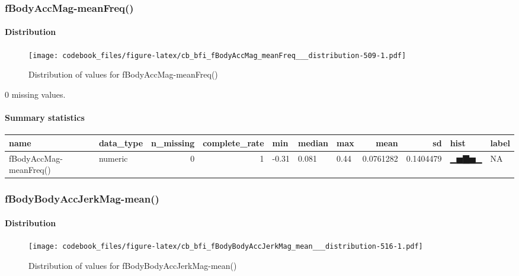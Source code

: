 \documentclass[
]{article}
\begin{document}
\hypertarget{fBodyAccMag_meanFreq__}{%
\subsubsection{fBodyAccMag-meanFreq()}\label{fBodyAccMag_meanFreq__}}

\hypertarget{fBodyAccMag_meanFreq___distribution}{%
\paragraph{Distribution}\label{fBodyAccMag_meanFreq___distribution}}

\begin{figure}
\centering
\texttt{[image: codebook\_files/figure-latex/cb\_bfi\_fBodyAccMag\_meanFreq\_\_\_distribution-509-1.pdf]}
\caption{Distribution of values for fBodyAccMag-meanFreq()}
\end{figure}

0 missing values.

\hypertarget{fBodyAccMag_meanFreq___summary}{%
\paragraph{Summary statistics}\label{fBodyAccMag_meanFreq___summary}}

\begin{longtable}[]{@{}llrrlllrrll@{}}
\toprule
name & data\_type & n\_missing & complete\_rate & min & median & max &
mean & sd & hist & label \\
\midrule
\endhead
fBodyAccMag-meanFreq() & numeric & 0 & 1 & -0.31 & 0.081 & 0.44 &
0.0761282 & 0.1404479 & ▁▅▇▅▁ & NA \\
\bottomrule
\end{longtable}

\hypertarget{fBodyBodyAccJerkMag_mean__}{%
\subsubsection{fBodyBodyAccJerkMag-mean()}\label{fBodyBodyAccJerkMag_mean__}}

\hypertarget{fBodyBodyAccJerkMag_mean___distribution}{%
\paragraph{Distribution}\label{fBodyBodyAccJerkMag_mean___distribution}}

\begin{figure}
\centering
\texttt{[image: codebook\_files/figure-latex/cb\_bfi\_fBodyBodyAccJerkMag\_mean\_\_\_distribution-516-1.pdf]}
\caption{Distribution of values for fBodyBodyAccJerkMag-mean()}
\end{figure}
\end{document}
